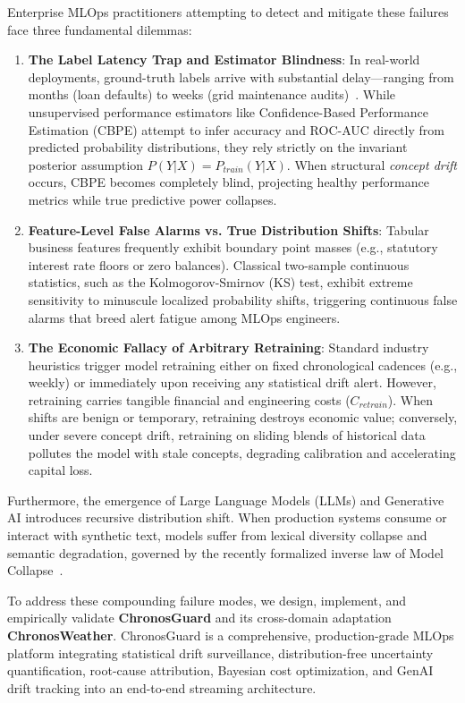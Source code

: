 \documentclass[conference]{IEEEtran}
\begin{document}
Enterprise MLOps practitioners attempting to detect and mitigate these failures face three fundamental dilemmas:
\begin{enumerate}
    \item \textbf{The Label Latency Trap and Estimator Blindness}: In real-world deployments, ground-truth labels arrive with substantial delay---ranging from months (loan defaults) to weeks (grid maintenance audits)~\cite{garg2022leveraging}. While unsupervised performance estimators like Confidence-Based Performance Estimation (CBPE) attempt to infer accuracy and ROC-AUC directly from predicted probability distributions, they rely strictly on the invariant posterior assumption $P(Y|X) = P_{train}(Y|X)$. When structural \textit{concept drift} occurs, CBPE becomes completely blind, projecting healthy performance metrics while true predictive power collapses.
    \item \textbf{Feature-Level False Alarms vs. True Distribution Shifts}: Tabular business features frequently exhibit boundary point masses (e.g., statutory interest rate floors or zero balances). Classical two-sample continuous statistics, such as the Kolmogorov-Smirnov (KS) test, exhibit extreme sensitivity to minuscule localized probability shifts, triggering continuous false alarms that breed alert fatigue among MLOps engineers.
    \item \textbf{The Economic Fallacy of Arbitrary Retraining}: Standard industry heuristics trigger model retraining either on fixed chronological cadences (e.g., weekly) or immediately upon receiving any statistical drift alert. However, retraining carries tangible financial and engineering costs ($C_{retrain}$). When shifts are benign or temporary, retraining destroys economic value; conversely, under severe concept drift, retraining on sliding blends of historical data pollutes the model with stale concepts, degrading calibration and accelerating capital loss.
\end{enumerate}

Furthermore, the emergence of Large Language Models (LLMs) and Generative AI introduces recursive distribution shift. When production systems consume or interact with synthetic text, models suffer from lexical diversity collapse and semantic degradation, governed by the recently formalized inverse law of Model Collapse~\cite{shumailov2024ai, hajmohammed2025concept}.

To address these compounding failure modes, we design, implement, and empirically validate \textbf{ChronosGuard} and its cross-domain adaptation \textbf{ChronosWeather}. ChronosGuard is a comprehensive, production-grade MLOps platform integrating statistical drift surveillance, distribution-free uncertainty quantification, root-cause attribution, Bayesian cost optimization, and GenAI drift tracking into an end-to-end streaming architecture.
\end{document}
